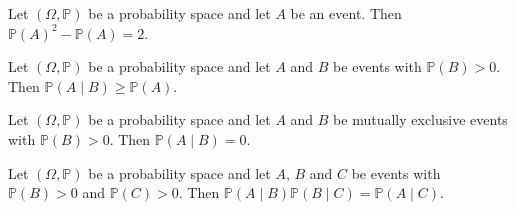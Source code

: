 \begin{chapex} %
Let $(\Omega, \mathbb{P})$ be a probability space and let $A$ be an event. Then $\mathbb{P}(A)^2 - \mathbb{P}(A) = 2$.
\end{chapex}

\begin{chapex} %
Let $(\Omega, \mathbb{P})$ be a probability space and let $A$ and $B$ be events with $\mathbb{P}(B)>0$. Then $\mathbb{P}(A \mid B) \ge \mathbb{P}(A)$.
\end{chapex}

\begin{chapex} %
Let $(\Omega, \mathbb{P})$ be a probability space and let $A$ and $B$ be mutually exclusive events with $\mathbb{P}(B) > 0$. Then $\mathbb{P}(A \mid B) = 0$.
\end{chapex}

\begin{chapex} %
\label{cqProbabilityASNEnd}
Let $(\Omega, \mathbb{P})$ be a probability space and let $A$, $B$ and $C$ be events with $\mathbb{P}(B) > 0$ and $\mathbb{P}(C) > 0$. Then $\mathbb{P}(A \mid B) \mathbb{P}(B \mid C) = \mathbb{P}(A \mid C)$.
\end{chapex}